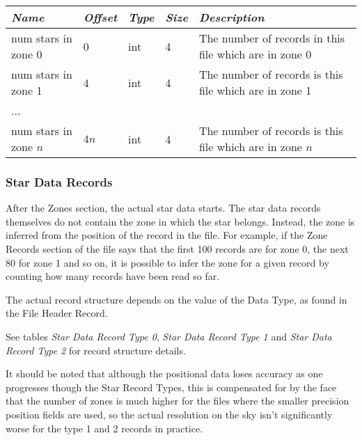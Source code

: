 \begin{longtabu} to \textwidth {l l l l X}\toprule
\emph{Name} & \emph{Offset} & \emph{Type} & \emph{Size} &\emph{Description}\\\midrule
num stars in zone 0   & 0    & int & 4 & The number of records in this file which are in zone 0\\\midrule
num stars in zone 1   & 4    & int & 4 & The number of records is this file which are in zone 1\\
...                   &      &     &   &\\
num stars in zone $n$ & $4n$ & int & 4 & The number of records is this file which are in zone $n$\\\bottomrule
\end{longtabu}

\subsubsection{Star Data Records}%
\label{sec:Catalogues:stars:record:data}

After the Zones section, the actual star data starts. The star data
records themselves do not contain the zone in which the star belongs.
Instead, the zone is inferred from the position of the record in the
file. For example, if the Zone Records section of the file says that the
first 100 records are for zone 0, the next 80 for zone 1 and so on, it
is possible to infer the zone for a given record by counting how many
records have been read so far.

The actual record structure depends on the value of the Data Type, as
found in the File Header Record.

See tables \emph{Star Data Record Type 0}, \emph{Star Data Record Type
1} and \emph{Star Data Record Type 2} for record structure details.

It should be noted that although the positional data loses accuracy as
one progresses though the Star Record Types, this is compensated for by
the face that the number of zones is much higher for the files where the
smaller precision position fields are used, so the actual resolution on
the sky isn't significantly worse for the type 1 and 2 records in
practice.

